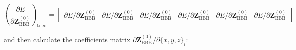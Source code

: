 \documentclass{article}
\begin{document}
\begin{equation}
\left(\frac{\partial{E}}{\partial{\mathbf{Z}^{(0)}_{\mathrm{BBB}}}}\right)_{\mathrm{tiled}} = 
\left[\begin{array}{cccccc}
\partial{E} / \partial{\mathbf{Z}^{(0)}_{\mathrm{BBB}}} & 
\partial{E} / \partial{\mathbf{Z}^{(0)}_{\mathrm{BBB}}} &
\partial{E} / \partial{\mathbf{Z}^{(0)}_{\mathrm{BBB}}} & 
\partial{E} / \partial{\mathbf{Z}^{(0)}_{\mathrm{BBB}}} &
\partial{E} / \partial{\mathbf{Z}^{(0)}_{\mathrm{BBB}}} & 
\partial{E} / \partial{\mathbf{Z}^{(0)}_{\mathrm{BBB}}} 
\end{array}
\right]
\end{equation}

\noindent and then calculate the coefficients matrix 
$\partial{\mathbf{Z}^{(0)}_{\mathrm{BBB}}} / \partial{\{x, y, z\}_i}$:
\end{document}
